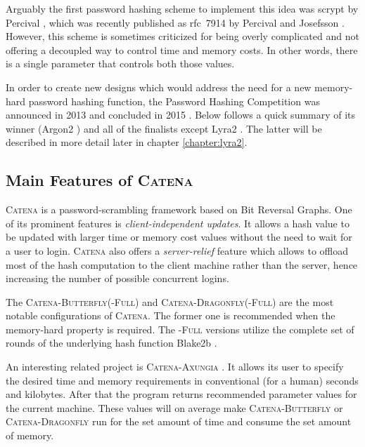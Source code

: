 Arguably the first password hashing scheme to implement this idea was scrypt by Percival \cite{percival:2016:scrypt}, which was recently published as \mbox{\gls{rfc} 7914} by Percival and Josefsson \cite{rfc7914}. However, this scheme is sometimes criticized for being overly complicated and not offering a decoupled way to control time and memory costs. In other words, there is a single parameter that controls both those values.

In order to create new designs which would address the need for a new memory-hard password hashing function, the Password Hashing Competition was announced in 2013 and concluded in 2015 \cite{wetzels:2016:phc}. Below follows a quick summary of its winner (Argon2 \cite{biryukov:2015:argon2}) and all of the finalists except Lyra2 \cite{andrade:2016:lyra2}. The latter will be described in more detail later in chapter \ref{chapter:lyra2}.

\subsection{Main Features of \textsc{Catena}}
\label{sec:catena}

\textsc{Catena} \cite{forler:2013:catena} is a password-scrambling framework based on Bit Reversal Graphs. One of its prominent features is \emph{client-independent updates}. It allows a hash value to be updated with larger time or memory cost values without the need to wait for a user to login. \textsc{Catena} also offers a \emph{server-relief} feature which allows to offload most of the hash computation to the client machine rather than the server, hence increasing the number of possible concurrent logins.

The \textsc{Catena-Butterfly(-Full)} and \textsc{Catena-Dragonfly(-Full)} are the most notable configurations of \textsc{Catena}. The former one is recommended when the memory-hard property is required. The \textsc{-Full} versions utilize the complete set of rounds of the underlying hash function Blake2b \cite{aumasson:2013:blake2}.

An interesting related project is \textsc{Catena-Axungia} \cite{github:2017:catena-axungia}. It allows its user to specify the desired time and memory requirements in conventional (for a human) seconds and kilobytes. After that the program returns recommended parameter values for the current machine. These values will on average make \textsc{Catena-Butterfly} or \textsc{Catena-Dragonfly} run for the set amount of time and consume the set amount of memory.

